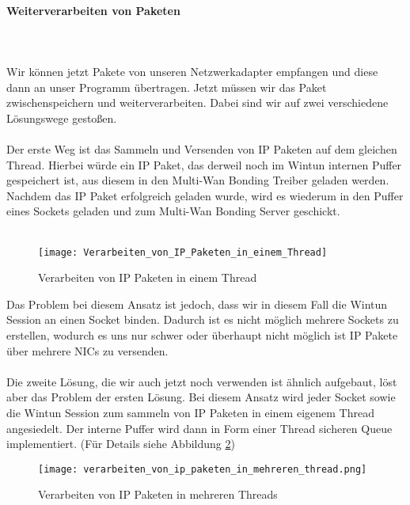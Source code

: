 \newpage

\paragraph{Weiterverarbeiten von Paketen}
\ \\\\
Wir können jetzt Pakete von unseren Netzwerkadapter empfangen und diese dann an unser Programm übertragen. Jetzt müssen wir das Paket zwischenspeichern und weiterverarbeiten. Dabei sind wir auf zwei verschiedene Lösungswege gestoßen.
\\\\
Der erste Weg ist das Sammeln und Versenden von IP Paketen auf dem gleichen Thread. Hierbei würde ein IP Paket, das derweil noch im Wintun internen Puffer gespeichert ist, aus diesem in den Multi-Wan Bonding Treiber geladen werden. Nachdem das IP Paket erfolgreich geladen wurde, wird es wiederum in den Puffer eines Sockets geladen und zum Multi-Wan Bonding Server geschickt. 
\\\\
\begin{figure}[H]
    \centering
    \texttt{[image: Verarbeiten\_von\_IP\_Paketen\_in\_einem\_Thread]}
    \caption[Verarbeiten von IP Paketen in einem Thread]{Verarbeiten von IP Paketen in einem Thread}
    \label{driver-process-pakets-one-thread}
\end{figure}
\noindent
Das Problem bei diesem Ansatz ist jedoch, dass wir in diesem Fall die Wintun Session an einen Socket binden. Dadurch ist es nicht möglich mehrere Sockets zu erstellen, wodurch es uns nur schwer oder überhaupt nicht möglich ist IP Pakete über mehrere NICs zu versenden. 
\\\\
Die zweite Lösung, die wir auch jetzt noch verwenden ist ähnlich aufgebaut, löst aber das Problem der ersten Lösung. Bei diesem Ansatz wird jeder Socket sowie die Wintun Session zum sammeln von IP Paketen in einem eigenem Thread angesiedelt. Der interne Puffer wird dann in Form einer Thread sicheren Queue implementiert. (Für Details siehe Abbildung \ref{driver-process-pakets-many-threads})

\newpage

\begin{figure}[H]
    \centering
    \texttt{[image: verarbeiten\_von\_ip\_paketen\_in\_mehreren\_thread.png]}
    \caption[Verarbeiten von IP Paketen in mehreren Threads]{Verarbeiten von IP Paketen in mehreren Threads}
    \label{driver-process-pakets-many-threads}
\end{figure}
\noindent

